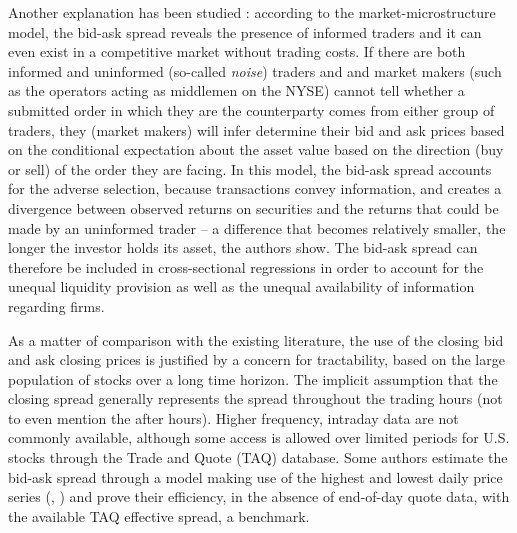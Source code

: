 Another explanation has been studied : according to the \textcite{Glosten1985} market-microstructure model, the bid-ask spread reveals the presence of informed traders and it can even exist in a competitive market without trading costs. If there are both informed and uninformed (so-called \emph{noise}) traders and and market makers (such as the operators acting as middlemen on the NYSE) cannot tell whether a submitted order in which they are the counterparty comes from either group of traders, they (market makers) will infer determine their bid and ask prices based on the conditional expectation about the asset value based on the direction (buy or sell) of the order they are facing. In this model, the bid-ask spread accounts for the adverse selection, because transactions convey information, and creates a divergence between observed returns on securities and the returns that could be made by an uninformed trader -- a difference that becomes relatively smaller, the longer the investor holds its asset, the authors show. The bid-ask spread can therefore be included in cross-sectional regressions in order to account for the unequal liquidity provision as well as the unequal availability of information regarding firms.

As a matter of comparison with the existing literature, the use of the closing bid and ask closing prices is justified by a concern for tractability, based on the large population of stocks over a long time horizon. The implicit assumption that the closing spread generally represents the spread throughout the trading hours (not to even mention the after hours). Higher frequency, intraday data are not commonly available, although some access is allowed over limited periods for U.S. stocks through the Trade and Quote (TAQ) database. Some authors estimate the bid-ask spread through a model making use of the highest and lowest daily price series (\textcite{Corwin2012}, \textcite{Abdi2017}) and prove their efficiency, in the absence of end-of-day quote data, with the available TAQ effective spread, a benchmark.
